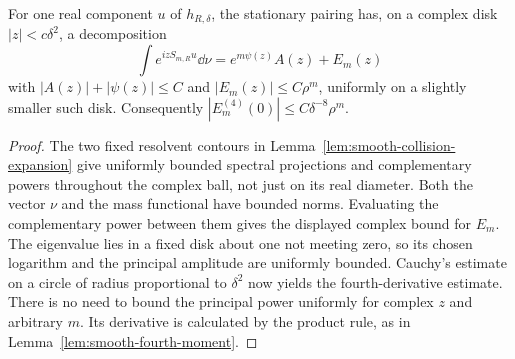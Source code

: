 \begin{lemma}
\label{lem:complex-fourth-details}
For one real component $u$ of $h_{R,\delta}$, the stationary pairing
has, on a complex disk $|z|<c\delta^2$, a decomposition
\[
 \int e^{izS_{m,R}u}\dd\nu=e^{m\psi(z)}A(z)+E_m(z)
\]
with $|A(z)|+|\psi(z)|\le C$ and $|E_m(z)|\le C\rho^m$, uniformly
on a slightly smaller such disk. Consequently
$|E_m^{(4)}(0)|\le C\delta^{-8}\rho^m$.
\end{lemma}
\begin{proof}
The two fixed resolvent contours in
Lemma~\ref{lem:smooth-collision-expansion} give uniformly bounded
spectral projections and complementary powers throughout the complex
ball, not just on its real diameter. Both the vector $\nu$ and the
mass functional have bounded norms. Evaluating the complementary
power between them gives the displayed complex bound for $E_m$.
The eigenvalue lies in a fixed disk about one not meeting zero, so its
chosen logarithm and the principal amplitude are uniformly bounded.
Cauchy's estimate on a circle of radius proportional to $\delta^2$
now yields the fourth-derivative estimate. There is no need to bound
the principal power uniformly for complex $z$ and arbitrary $m$.
Its derivative is calculated by the product rule, as in
Lemma~\ref{lem:smooth-fourth-moment}.
\end{proof}


